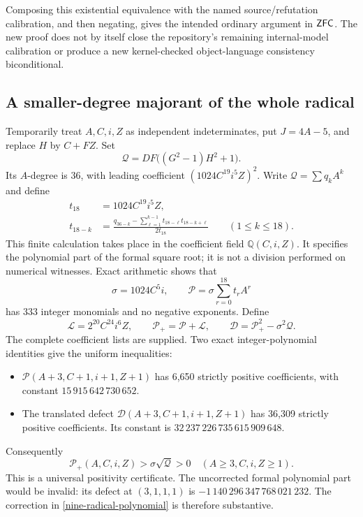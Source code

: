 Composing this existential equivalence with the named source/refutation
calibration, and then negating, gives the intended ordinary argument in
$\mathsf{ZFC}$.  The new proof does not by itself close the repository's
remaining internal-model calibration or produce a new kernel-checked
object-language consistency biconditional.

\subsection{A smaller-degree majorant of the whole radical}

Temporarily treat $A,C,i,Z$ as independent indeterminates, put $J=4A-5$,
and replace $H$ by $C+FZ$.  Set
\[
 \mathcal Q=DF\bigl((G^2-1)H^2+1\bigr).
\]
Its $A$-degree is 36, with leading coefficient
$(1024C^{19}i^5Z)^2$.  Write $\mathcal Q=\sum q_k A^k$ and define
\begin{align*}
 t_{18}&=1024C^{19}i^5Z,\\
 t_{18-k}&=\frac{q_{36-k}-\sum_{\ell=1}^{k-1}
                  t_{18-\ell}t_{18-k+\ell}}{2t_{18}}
                  \qquad(1\le k\le18).
\end{align*}
This finite calculation takes place in the coefficient field
$\mathbb Q(C,i,Z)$.  It specifies the polynomial part of the formal
square root; it is not a division performed on numerical witnesses.
Exact arithmetic shows that
\[
 \sigma=1024C^5i,\qquad
 \mathcal P=\sigma\sum_{r=0}^{18}t_r A^r
\]
has 333 integer monomials and no negative exponents.  Define
\begin{equation}
 \mathcal L=2^{20}C^{24}i^6Z,\qquad
 \mathcal P_+=\mathcal P+\mathcal L,\qquad
 \mathcal D=\mathcal P_+^2-\sigma^2\mathcal Q.
 \label{nine-radical-polynomial}
\end{equation}
The complete coefficient lists are supplied.  Two exact integer-polynomial
identities give the uniform inequalities:
\begin{itemize}
 \item $\mathcal P(A+3,C+1,i+1,Z+1)$ has 6,650 strictly positive coefficients,
       with constant $15\,915\,642\,730\,652$.
 \item The translated defect $\mathcal D(A+3,C+1,i+1,Z+1)$ has
       36,309 strictly positive coefficients. Its constant is
       $32\,237\,226\,735\,615\,909\,648$.
\end{itemize}
Consequently
\begin{equation}
 \mathcal P_+(A,C,i,Z)>\sigma\sqrt{\mathcal Q}>0
 \quad(A\ge3, C,i,Z\ge1).
 \label{nine-whole-bound}
\end{equation}
This is a universal positivity certificate.  The uncorrected formal
polynomial part would be invalid: its defect at $(3,1,1,1)$ is
$-1\,140\,296\,347\,768\,021\,232$.  The correction in
\eqref{nine-radical-polynomial} is therefore substantive.

